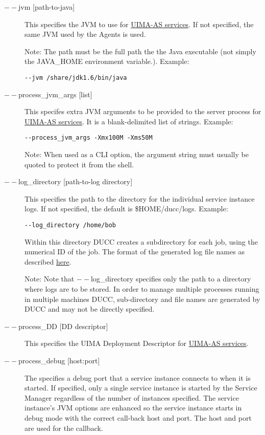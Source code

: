 \begin{description}
        \item[$--$jvm {[path-to-java]}] This specifies the JVM to use for 
          \hyperref[sec:services.types]{UIMA-AS services}. If not
          specified, the same JVM used by the Agents is used.  

          Note: The path must be the full path the the Java executable (not 
          simply the JAVA\_HOME environment variable.).  Example:
\begin{verbatim}
--jvm /share/jdk1.6/bin/java 
\end{verbatim}


        \item[$--$process\_jvm\_args {[list]} ]        
          This specifes extra JVM arguments to be provided to the server process for
          \hyperref[sec:services.types]{UIMA-AS services}. It is a blank-delimited 
            list of strings. Example: 
\begin{verbatim}
--process_jvm_args -Xmx100M -Xms50M
\end{verbatim}

          Note: When used as a CLI option, the argument string must usually be quoted to protect
          it from the shell.
    
          \item[$--$log\_directory {[path-to-log directory]}] This specifies the path to the directory for
            the individual service instance logs. If not specified, the default is \$HOME/ducc/logs. Example:
\begin{verbatim}
--log_directory /home/bob 
\end{verbatim}
        
        Within this directory DUCC creates a subdirectory for each job, using the numerical 
        ID of the job. The format of the generated log file names as described
        \hyperref[chap:job-logs]{here}.
        
        Note: Note that $--$log\_directory specifies only the path to a directory where 
        logs are to be stored. In order to manage multiple processes running in multiple 
        machines DUCC, sub-directory and file names are generated by DUCC and may 
        not be directly specified. 

      \item[$--$process\_DD {[DD descriptor]}] 
        This specifies the UIMA Deployment Descriptor for \hyperref[sec:services.types]{UIMA-AS services}.

      \item[$--$process\_debug {[host:port]}]        
        The specifies a debug port that a service instance connects to when it is started.  If specified,
        only a single service instance is started by the Service Manager regardless of the number of
        instances specified.  The service instance's JVM options are enhanced so the service instance
        starts in debug mode with the correct call-back host and port.  The host and port are used
        for the callback.


\end{description}
